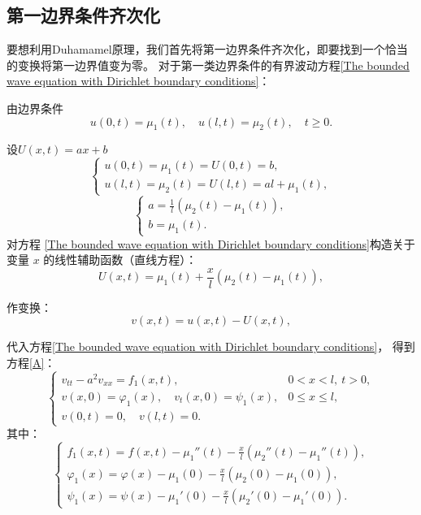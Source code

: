 \documentclass[12pt,a4paper]{article}
\numberwithin{subsection}{section}   %
\numberwithin{subsubsection}{subsection}
\theoremstyle{plain}
\theoremstyle{definition}
\theoremstyle{remark}
\theoremstyle{remark}
\begin{document}
	\subsection{第一边界条件齐次化}
	要想利用Duhamamel原理，我们首先将第一边界条件齐次化，即要找到一个恰当的变换将第一边界值变为零。
	对于第一类边界条件的有界波动方程\eqref{The bounded wave equation with Dirichlet boundary conditions}：
	
	由边界条件
	\begin{equation}
		u(0,t) = \mu_1(t), \quad u(l,t) = \mu_2(t), \quad t \geq 0.
	\end{equation}
	
	设$U(x, t)=ax+b$
	\[
	\begin{cases}
		u(0, t) = \mu_1(t) = U(0, t) = b, \\
		u(l, t) = \mu_2(t) = U(l, t) = al + \mu_1(t),
	\end{cases}
	\]
	\[
	\begin{cases}
		a = \frac{1}{l}(\mu_2(t) - \mu_1(t)), \\
		b = \mu_1(t).
	\end{cases}
	\]
	对方程 \eqref{The bounded wave equation with Dirichlet boundary conditions}构造关于变量 \(x\) 的线性辅助函数（直线方程）：
	\begin{equation}
		U(x, t) = \mu_1(t) + \frac{x}{l}(\mu_2(t) - \mu_1(t)),
	\end{equation}
	
	作变换：
	\begin{equation}
		v(x, t) = u(x, t) - U(x, t),
	\end{equation}
	
	 代入方程\eqref{The bounded wave equation with Dirichlet boundary conditions}，
	得到方程\eqref{A}：
	\begin{equation}\label{A}
	\begin{cases}
		v_{tt} - a^2 v_{xx} = f_1(x, t), & 0 < x < l, \ t > 0, \\
		v(x, 0) = \varphi_1(x), \quad v_t(x, 0) = \psi_1(x), & 0 \leq x \leq l, \\
		v(0, t) = 0, \quad v(l, t) = 0. &
	\end{cases}
\end{equation}
	其中：
	\begin{equation}
		\begin{cases}
			f_1(x, t) = f(x, t) - \mu_1''(t) - \frac{x}{l}(\mu_2''(t) - \mu_1''(t)), \\
			\varphi_1(x) = \varphi(x) - \mu_1(0) - \frac{x}{l}(\mu_2(0) - \mu_1(0)), \\
			\psi_1(x) = \psi(x) - \mu_1'(0) - \frac{x}{l}(\mu_2'(0) - \mu_1'(0)).
		\end{cases}
	\end{equation}
	
\end{document}
